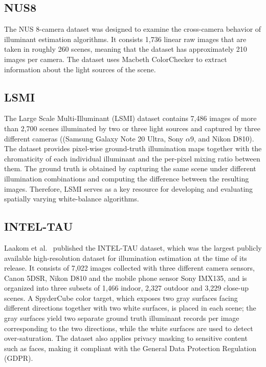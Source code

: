 \subsection{NUS8}

The NUS 8-camera dataset \cite{cheng2014illuminant} was designed to examine the cross-camera behavior of illuminant estimation algorithms. It consists 1,736 linear raw images that are taken in roughly 260 scenes, meaning that the dataset has approximately 210 images per camera. The dataset uses Macbeth ColorChecker to extract information about the light sources of the scene.

\subsection{LSMI}

The Large Scale Multi-Illuminant (LSMI) dataset \cite{kim2021lsmi} contains 7,486 images of more than 2,700 scenes illuminated by two or three light sources and captured by three different cameras ((Samsung Galaxy Note 20 Ultra, Sony $\alpha$9, and Nikon D810). The dataset provides pixel-wise ground-truth illumination maps together with the chromaticity of each individual illuminant and the per-pixel mixing ratio between them. The ground truth is obtained by capturing the same scene under different illumination combinations and computing the difference between the resulting images. Therefore, LSMI serves as a key resource for developing and evaluating spatially varying white-balance algorithms.

\subsection{INTEL-TAU}

Laakom et al.~\cite{intelTAU} published the INTEL-TAU dataset, which was the largest publicly available high-resolution dataset for illumination estimation at the time of its release. It consists of 7,022 images collected with three different camera sensors, Canon 5DSR, Nikon D810 and the mobile phone sensor Sony IMX135, and is organized into three subsets of 1,466 indoor, 2,327 outdoor and 3,229 close-up scenes. A SpyderCube color target, which exposes two gray surfaces facing different directions together with two white surfaces, is placed in each scene; the gray surfaces yield two separate ground truth illuminant records per image corresponding to the two directions, while the white surfaces are used to detect over-saturation. The dataset also applies privacy masking to sensitive content such as faces, making it compliant with the General Data Protection Regulation (GDPR).


